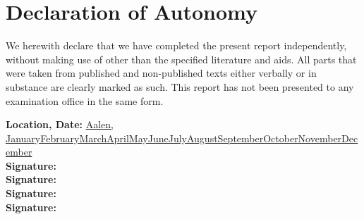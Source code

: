
\section*{Declaration of Autonomy}
We herewith declare that we have completed the present report independently, without making use of other than the specified literature and aids. All parts that were taken from published and non-published texts either verbally or in substance are clearly marked as such. This report has not been presented to any examination office in the same form.
\begin{flushleft}
	  \textbf{Location, Date:} \underline{Aalen, \number\day\space\ifcase\month\or January\or February\or March\or April\or May\or June\or July\or August\or September\or October\or November\or December\fi\space\number\year \hspace{5cm}} \\
    \vspace{1cm}
    \textbf{Signature:} \underline{\hspace{5cm}}\\
   	\vspace{1cm}
    \textbf{Signature:} \underline{\hspace{5cm}}\\
    \vspace{1cm}
    \textbf{Signature:} \underline{\hspace{5cm}}\\
    \vspace{1cm}
    \textbf{Signature:} \underline{\hspace{5cm}}
\end{flushleft}

